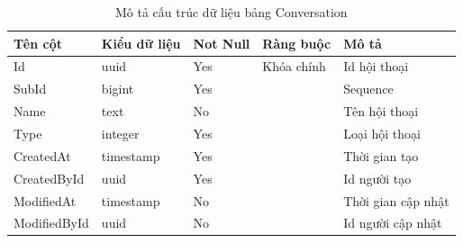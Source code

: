 \documentclass[../index.tex]{subfiles}
\begin{document}
    \begin{table}[H]
        \begin{tabular}{ |p{3cm}|p{2.5cm}|p{1.6cm}|p{2.2cm}|p{3cm}| }
            \hline
            Tên cột      & Kiểu dữ liệu             & Not Null & Ràng buộc  & Mô tả              \\
            \hline
            Id           & uuid                     & Yes      & Khóa chính & Id hội thoại       \\
            \hline
            SubId        & bigint                   & Yes      &            & Sequence           \\
            \hline
            Name         & text    & No       &            & Tên hội thoại      \\
            \hline
            Type         & integer                  & Yes      &            & Loại hội thoại     \\
            \hline
            CreatedAt    & timestamp & Yes      &            & Thời gian tạo      \\
            \hline
            CreatedById  & uuid                     & Yes      &            & Id người tạo       \\
            \hline
            ModifiedAt   & timestamp & No       &            & Thời gian cập nhật \\
            \hline
            ModifiedById & uuid                     & No       &            & Id người cập nhật  \\
            \hline
        \end{tabular}
        \caption{Mô tả cấu trúc dữ liệu bảng Conversation}
    \end{table}
\end{document}
